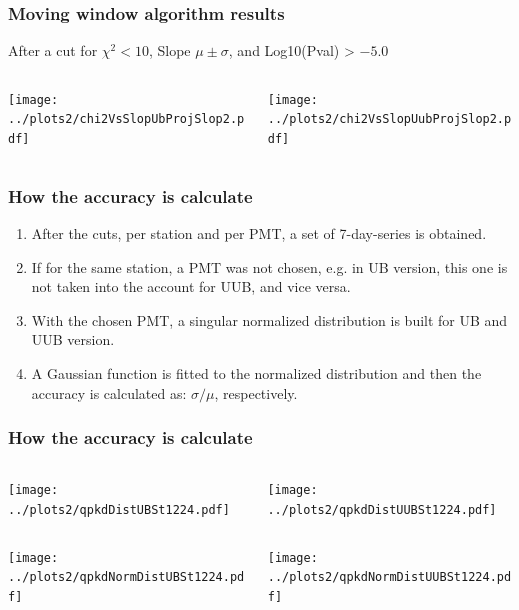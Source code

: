 \documentclass[aspectratio=169]{beamer}
\begin{document}
\begin{frame}
  \frametitle{Moving window algorithm results}
  After a cut for $\chi^2<10$, Slope $\mu\pm\sigma$, and
  Log10(Pval) > $-5.0$
  \vspace{0.5cm}
  \begin{columns}
    \begin{column}{0.5\textwidth}
      \texttt{[image: ../plots2/chi2VsSlopUbProjSlop2.pdf]}
    \end{column}
    \begin{column}{0.5\textwidth}
      \texttt{[image: ../plots2/chi2VsSlopUubProjSlop2.pdf]}
    \end{column}
  \end{columns}
\end{frame}

\begin{frame}
  \frametitle{How the accuracy is calculate}
  {\footnotesize
  \begin{enumerate}
    \item After the cuts, per station and per PMT, a set of
      7-day-series is obtained.
    \item If for the same station, a PMT was not chosen, e.g.
      in UB version, this one is not taken into the account for
      UUB, and vice versa.
    \item With the chosen PMT, a singular normalized
      distribution is built for UB and UUB version.
    \item A Gaussian function is fitted to the normalized
      distribution and then the accuracy is calculated as:
      $\sigma/\mu$, respectively.
  \end{enumerate}
  }
\end{frame}

\begin{frame}
  \frametitle{How the accuracy is calculate}
  \begin{columns}
    \begin{column}{0.5\textwidth}
      \texttt{[image: ../plots2/qpkdDistUBSt1224.pdf]}
    \end{column}
    \begin{column}{0.5\textwidth}
      \texttt{[image: ../plots2/qpkdDistUUBSt1224.pdf]}
    \end{column}
  \end{columns}
  \begin{columns}
    \begin{column}{0.5\textwidth}
      \texttt{[image: ../plots2/qpkdNormDistUBSt1224.pdf]}
    \end{column}
    \begin{column}{0.5\textwidth}
      \texttt{[image: ../plots2/qpkdNormDistUUBSt1224.pdf]}
    \end{column}
  \end{columns}
\end{frame}
\end{document}
